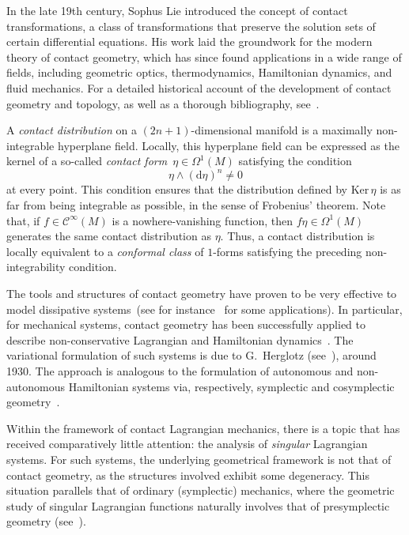 \documentclass[11pt,twoside]{article}
\theoremstyle{plain}
\theoremstyle{definition}
\renewcommand{\d}{\mathrm{d}}
\newcommand{\Cinfty}{\mathscr{C}^\infty}
\def\d{\mathrm{d}}
\def\d{\mathrm{d}}
\def\Ker{\mathrm{Ker \,}}
\begin{document}
In the late 19th century, Sophus Lie introduced the concept of contact transformations, a class of transformations that preserve the solution sets of certain differential equations. 
His work laid the groundwork for the modern theory of contact geometry, which has since found applications in a wide range of fields, including geometric optics, thermodynamics, Hamiltonian dynamics, and fluid mechanics. 
For a detailed historical account of the development of contact geometry and topology, as well as a thorough bibliography, see~\cite{Gei_01}.

A \emph{contact distribution} on a $(2n{+}1)$-dimensional manifold is a maximally non-integrable hyperplane field. 
Locally, this hyperplane field can be expressed as the kernel of a so-called \emph{contact form}~$\eta\in \Omega^1(M)$ satisfying the condition
\[
\eta \wedge (\d\eta)^n \neq 0
\]
at every point. 
This condition ensures that the distribution defined by $\Ker\eta$ is as far from being integrable as possible, in the sense of Frobenius' theorem. 
Note that, if $f \in \Cinfty(M)$ is a nowhere-vanishing function, 
then $f\eta \in \Omega^1(M)$ generates the same contact distribution as $\eta$.
Thus, a contact distribution is locally equivalent to a \emph{conformal class} of $1$-forms satisfying the preceding non-integrability condition. 

The tools and structures of contact geometry have proven to be very effective to model dissipative systems~(see for instance~\cite{Bra_18,Got_16,RMS_17} for some applications). 
In particular, for mechanical systems, contact geometry has been successfully applied to describe non-conservative Lagrangian and Hamiltonian dynamics~\cite{Lainz_19,GGMRR_21}. 
The variational formulation of such systems is due to G.~Herglotz (see~\cite{Herglotz1930,Herglotz1985}), around 1930. 
The approach is analogous to the formulation of autonomous and non-autonomous Hamiltonian systems via, respectively, symplectic and cosymplectic geometry~\cite{MR_2025}.

Within the framework of contact Lagrangian mechanics, there is a topic that has received comparatively little attention: 
the analysis of \emph{singular} Lagrangian systems. 
For such systems, the underlying geometrical framework is not that of contact geometry, as the structures involved exhibit some degeneracy. 
This situation parallels that of ordinary (symplectic) mechanics, where the geometric study of singular Lagrangian functions naturally involves that of presymplectic geometry (see~\cite{Car_1990, GNH_1978}).
\end{document}
